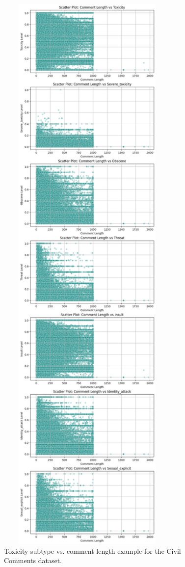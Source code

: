 \documentclass[10pt,a4paper,oneside]{article} %
\begin{document}
\begin{enumerate}
    \begin{figure}[h]
    \centering
    \includegraphics[width=0.8\textwidth,clip,trim=0 865 0 865.5]{replibert/replibert/plots/toxicity_length_cc.png}
    \caption{Toxicity subtype vs. comment length example for the Civil Comments dataset.}
    \label{fig:tox_vs_len_cc}
    \end{figure}
\end{enumerate}
\end{document}
